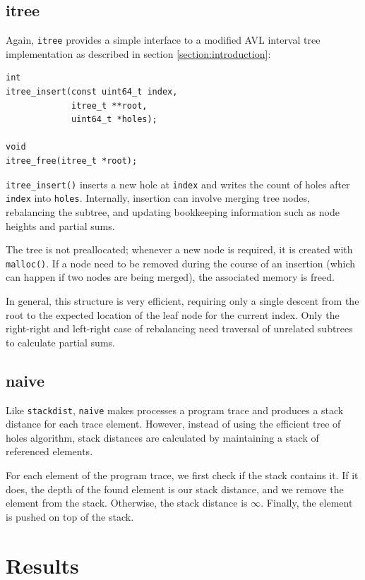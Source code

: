 \documentclass[a4paper,10pt]{article}
\begin{document}
\subsection{itree}

Again, \verb|itree| provides a simple interface to a modified AVL interval tree implementation
as described in section \ref{section:introduction}:

\begin{lstlisting}
int
itree_insert(const uint64_t index,
             itree_t **root,
             uint64_t *holes);

void
itree_free(itree_t *root);
\end{lstlisting}

\lstinline|itree_insert()| inserts a new hole at \lstinline|index| and writes the
count of holes after \lstinline|index| into \lstinline|holes|. Internally, insertion
can involve merging tree nodes, rebalancing the subtree, and updating bookkeeping information
such as node heights and partial sums.

The tree is not preallocated; whenever a new node is required, it is created with \lstinline|malloc()|.
If a node need to be removed during the course of an insertion (which can happen if two nodes are being
merged), the associated memory is freed.

In general, this structure is very efficient, requiring only a single descent from
the root to the expected location of the leaf node for the current index. Only
the right-right and left-right case of rebalancing need traversal of unrelated subtrees
to calculate partial sums.

\subsection{naive}

Like \verb|stackdist|, \verb|naive| makes processes a program trace and produces
a stack distance for each trace element. However, instead of using the efficient
tree of holes algorithm, stack distances are calculated by maintaining a stack
of referenced elements.

For each element of the program trace, we first check if the stack contains it.
If it does, the depth of the found element is our stack distance, and we remove
the element from the stack. Otherwise, the stack distance is $\infty$. Finally,
the element is pushed on top of the stack.

\section{Results}
\end{document}
